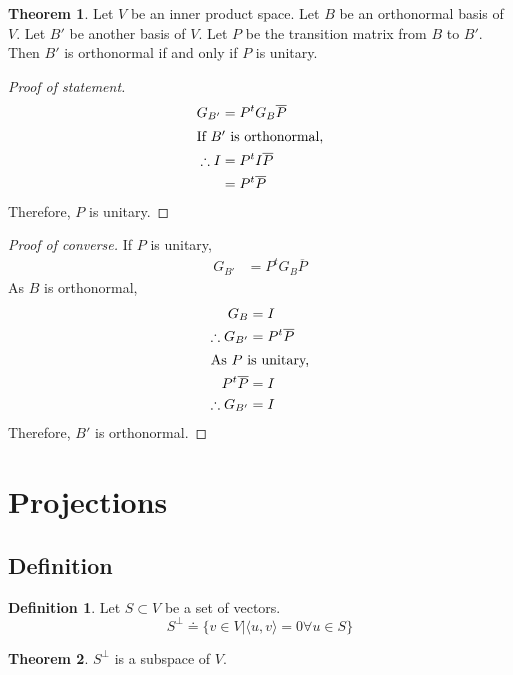 \documentclass[fleqn, a4paper, 12pt]{article}
\theoremstyle{definition}
\newtheorem{definition}{Definition} %
\theoremstyle{theorem}
\newtheorem{theorem}{Theorem} %
\theoremstyle{remark}
\numberwithin{corollary}{theorem}
\numberwithin{equation}{theorem}
\begin{document}
\begin{theorem}
	Let $V$ be an inner product space. Let $B$ be an orthonormal basis of $V$. Let $B'$ be another basis of $V$. Let $P$ be the transition matrix from $B$ to $B'$. Then $B'$ is orthonormal if and only if $P$ is unitary.
\end{theorem}

\begin{proof}[Proof of statement]
	\begin{align*}
	G_{B'} &= P^t G_B \overline{P}\\
	\intertext{If $B'$ is orthonormal,}
	\therefore I &= P^t I \overline{P}\\
	&= P^t \overline{P}
	\end{align*}
	Therefore, $P$ is unitary.
\end{proof}

\begin{proof}[Proof of converse]
	If $P$ is unitary, 
	\begin{align*}
		G_{B'} &= P^t G_B \overline{P}
	\end{align*}
	As $B$ is orthonormal,
	\begin{align*}
		G_B &= I\\
		\therefore G_{B'} &= P^t \overline{P}\\
		\intertext{As $P$ is unitary,}
		P^t \overline{P} &= I\\
		\therefore G_{B'} &= I
	\end{align*}
	Therefore, $B'$ is orthonormal.
\end{proof}

\section{Projections}

\subsection{Definition}

\begin{definition}
	Let $S \subset V$ be a set of vectors. 
	\begin{equation*}
		S^{\perp} \doteq \{v \in V | \langle u, v \rangle = 0 \forall u \in S\}
	\end{equation*}
\end{definition}

\begin{theorem}
	$S^{\perp}$ is a subspace of $V$.
\end{theorem}
\end{document}
